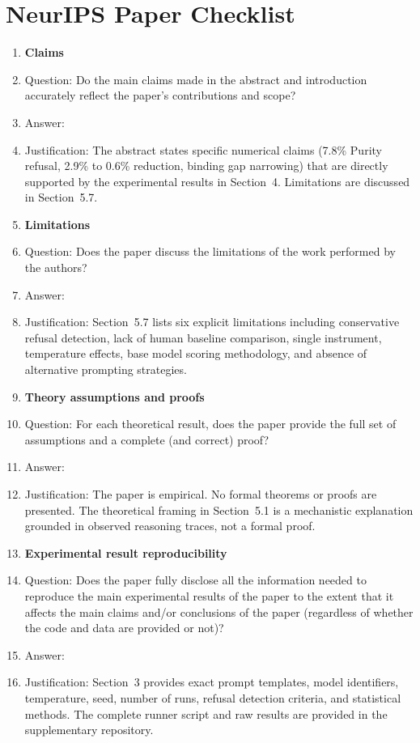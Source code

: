 \section*{NeurIPS Paper Checklist}

\begin{enumerate}

\item {\bf Claims}
    \item[] Question: Do the main claims made in the abstract and introduction accurately reflect the paper's contributions and scope?
    \item[] Answer: \answerYes{}
    \item[] Justification: The abstract states specific numerical claims (7.8\% Purity refusal, 2.9\% to 0.6\% reduction, binding gap narrowing) that are directly supported by the experimental results in Section~4. Limitations are discussed in Section~5.7.

\item {\bf Limitations}
    \item[] Question: Does the paper discuss the limitations of the work performed by the authors?
    \item[] Answer: \answerYes{}
    \item[] Justification: Section~5.7 lists six explicit limitations including conservative refusal detection, lack of human baseline comparison, single instrument, temperature effects, base model scoring methodology, and absence of alternative prompting strategies.

\item {\bf Theory assumptions and proofs}
    \item[] Question: For each theoretical result, does the paper provide the full set of assumptions and a complete (and correct) proof?
    \item[] Answer: \answerNA{}
    \item[] Justification: The paper is empirical. No formal theorems or proofs are presented. The theoretical framing in Section~5.1 is a mechanistic explanation grounded in observed reasoning traces, not a formal proof.

    \item {\bf Experimental result reproducibility}
    \item[] Question: Does the paper fully disclose all the information needed to reproduce the main experimental results of the paper to the extent that it affects the main claims and/or conclusions of the paper (regardless of whether the code and data are provided or not)?
    \item[] Answer: \answerYes{}
    \item[] Justification: Section~3 provides exact prompt templates, model identifiers, temperature, seed, number of runs, refusal detection criteria, and statistical methods. The complete runner script and raw results are provided in the supplementary repository.


\end{enumerate}
